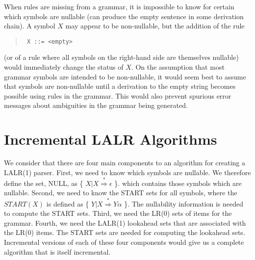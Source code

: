 When rules are missing from a grammar, it is impossible to know for certain
which symbols are nullable (can produce the empty sentence in some
derivation chain).
A symbol $X$ may appear to be non-nullable, but the addition of the rule
\begin{quote}
\tt
X  ::=  <empty>
\end{quote}
(or of a rule where all symbols on the right-hand side are themselves nullable)
would immediately change the status of $X$.
On the assumption that most grammar symbols are intended to be
non-nullable,
it would seem best to assume that symbols are non-nullable
until a derivation
to the empty string becomes possible using rules in the grammar.
This would also prevent spurious error messages about ambiguities in the
grammar being generated.

\section{Incremental LALR Algorithms}

We consider that there are four main components to an algorithm for
creating a LALR(1) parser.
First, we need to know which symbols are nullable.
We therefore define the set, NULL, as
\{ $X | X \stackrel{*}{\Rightarrow} \epsilon$ \}.
which contains those symbols which are nullable.
Second, we need to know the START sets for all symbols,
where the $START(X)$ is defined as
\{ $Y | X \stackrel{*}{\Rightarrow} Y \alpha$ \}.
The nullability information is needed to compute the START sets.
Third, we need the LR(0) sets of items for the grammar.
Fourth, we need the LALR(1) lookahead sets that are associated
with the LR(0) items.
The START sets are needed for computing the lookahead sets.
Incremental versions of each of these four components would give us
a complete algorithm that is itself incremental.

